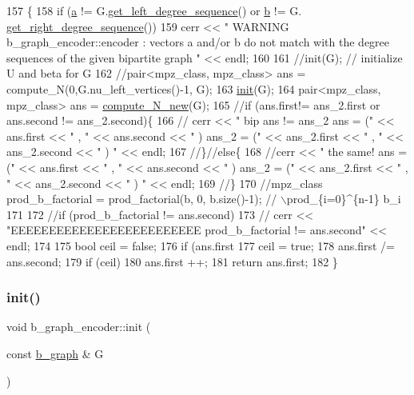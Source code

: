 \begin{DoxyCode}
157 \{
158   \textcolor{keywordflow}{if} (\hyperlink{classb__graph__encoder_afd22d167f495cd85b41397f337c377c2}{a} != G.\hyperlink{classb__graph_afd65fb655f7e24217393a10533b87d3c}{get\_left\_degree\_sequence}() or \hyperlink{classb__graph__encoder_a767826e268702e45ab71565e096a52b8}{b} != G.
      \hyperlink{classb__graph_a2711566385b92b02f4c03abdc1f9a582}{get\_right\_degree\_sequence}())
159     cerr << \textcolor{stringliteral}{" WARNING b\_graph\_encoder::encoder : vectors a and/or b do not match with the degree sequences
       of the given bipartite graph  "} << endl;
160 
161   \textcolor{comment}{//init(G); // initialize U and beta for G}
162   \textcolor{comment}{//pair<mpz\_class, mpz\_class> ans = compute\_N(0,G.nu\_left\_vertices()-1, G);}
163   \hyperlink{classb__graph__encoder_a9b62ac0580191ac42b98d764046af7cb}{init}(G);
164   pair<mpz\_class, mpz\_class> ans = \hyperlink{classb__graph__encoder_abb9153c776f8c9ec9aeb6361080e84d4}{compute\_N\_new}(G);
165   \textcolor{comment}{//if (ans.first!= ans\_2.first or ans.second != ans\_2.second)\{}
166   \textcolor{comment}{//  cerr << " bip ans != ans\_2 ans = (" << ans.first << " , " << ans.second <<  " ) ans\_2 = (" <<
       ans\_2.first << " , " << ans\_2.second << " ) "  << endl;}
167   \textcolor{comment}{//\}//else\{}
168   \textcolor{comment}{//cerr << " the same! ans = (" << ans.first << " , " << ans.second <<  " ) ans\_2 = (" << ans\_2.first << "
       , " << ans\_2.second << " ) "  << endl;}
169   \textcolor{comment}{//\}}
170   \textcolor{comment}{//mpz\_class prod\_b\_factorial = prod\_factorial(b, 0, b.size()-1); // \(\backslash\)prod\_\{i=0\}^\{n-1\} b\_i}
171 
172   \textcolor{comment}{//if (prod\_b\_factorial != ans.second)}
173   \textcolor{comment}{//  cerr << "EEEEEEEEEEEEEEEEEEEEEEEEE prod\_b\_factorial != ans.second" << endl;}
174 
175   \textcolor{keywordtype}{bool} ceil = \textcolor{keyword}{false};
176   \textcolor{keywordflow}{if} (ans.first %
177     ceil = \textcolor{keyword}{true};
178   ans.first /= ans.second;
179   \textcolor{keywordflow}{if} (ceil)
180     ans.first ++;
181   \textcolor{keywordflow}{return} ans.first;
182 \}
\end{DoxyCode}
\mbox{\label{classb__graph__encoder_a9b62ac0580191ac42b98d764046af7cb}} 
\subsubsection{\texorpdfstring{init()}{init()}}
{\footnotesize\ttfamily void b\+\_\+graph\+\_\+encoder\+::init (\begin{DoxyParamCaption}\item[{const \hyperlink{classb__graph}{b\+\_\+graph} \&}]{G }\end{DoxyParamCaption})}



